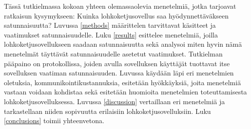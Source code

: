 Tässä tutkielmassa kokoan yhteen olemassaolevia menetelmiä, jotka tarjoavat ratkaisun kysymykseen: Kuinka lohkoketjusovellus saa hyödynnettäväkseen satunnaisuutta? Luvussa \ref{methods} määrittelen tarvittavat käsitteet ja vaatimukset satunnaisuudelle. Luku \ref{results} esittelee menetelmiä, joilla lohkoketjusovellukseen saadaan satunnaisuutta sekä analysoi miten hyvin nämä menetelmät täyttävät satunnaisuudelle asetetut vaatimukset. Tutkielman pääpaino on protokollissa, joiden avulla sovelluksen käyttäjät tuottavat itse sovelluksen vaatiman satunnaisuuden. Luvussa käydään läpi eri menetelmien oletuksia, kommunikointikustannuksia, esitetään hyökkäyksiä, joita menetelmiä vastaan voidaan kohdistaa sekä esitetään huomioita menetelmien toteuttamisesta lohkoketjusovelluksessa. Luvussa \ref{discussion} vertaillaan eri menetelmiä ja tarkastellaan niiden sopivuutta erilaisiin lohkoketjusovelluksiin. Luku \ref{conclusions} toimii yhteenvetona.